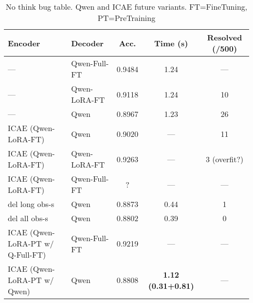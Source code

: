 \documentclass{article}
\begin{document}
\begin{table}[h]
    \centering
    \small
    \setlength{\tabcolsep}{4pt}
    \begin{tabular}{|ll|ccc|}
        \hline
        \textbf{Encoder} & \textbf{Decoder} & \textbf{Acc.} & \textbf{Time (s)} & \textbf{Resolved (/500)} \\
        \hline
        —                         & Qwen-Full-FT   & 0.9484 & 1.24                      & —         \\
        —                         & Qwen-LoRA-FT   & 0.9118 & 1.24                      & 10        \\
        —                         & Qwen           & 0.8967 & 1.23                      & 26        \\
        \hline
        ICAE (Qwen-LoRA-FT)       & Qwen           & 0.9020 & —                         & 11        \\
        ICAE (Qwen-LoRA-FT)       & Qwen-LoRA-FT   & 0.9263 & —                         & 3 (overfit?) \\
        ICAE (Qwen-LoRA-FT)       & Qwen-Full-FT   & ?      & —                         & —         \\
        \hline
        del long obs-s            & Qwen           & 0.8873 & 0.44                      & 1         \\
        del all obs-s             & Qwen           & 0.8802 & 0.39                      & 0         \\
        \hline
        ICAE (Qwen-LoRA-PT w/ Q-Full-FT) & Qwen-Full-FT   & 0.9219 & —                         & —         \\
        ICAE (Qwen-LoRA-PT w/ Qwen)      & Qwen           & 0.8808 & \textbf{1.12 (0.31+0.81)} & —         \\
        \hline
    \end{tabular}
    \caption{No think bug table. Qwen and ICAE future variants. FT=FineTuning, PT=PreTraining}
    \label{tab:qwen_icae_variants_absolute}
\end{table}
\end{document}
